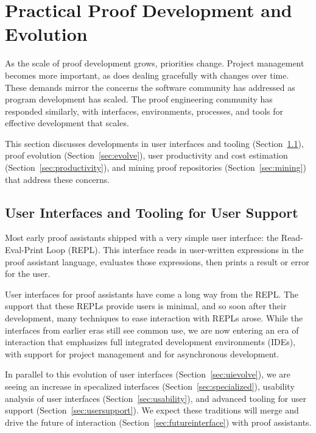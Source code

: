 \chapter{Practical Proof Development and Evolution}
\label{ch:development}

As the scale of proof development grows, priorities change. Project management becomes more important, as does dealing
gracefully with changes over time. These demands mirror the concerns the software community has addressed as 
program development has scaled. The proof engineering community has responded similarly, with interfaces,
environments, processes, and tools for effective development that scales.

This section discusses developments in user interfaces and tooling (Section~\ref{sec:user}),
proof evolution (Section~\ref{sec:evolve}), user productivity and cost estimation (Section~\ref{sec:productivity}),
and mining proof repositories (Section~\ref{sec:mining}) that address these concerns.


\section{User Interfaces and Tooling for User Support}
\label{sec:user}

Most early proof assistants shipped with a very simple user
interface: the Read-Eval-Print Loop (REPL). This interface reads in user-written
expressions in the proof assistant language, evaluates those expressions,
then prints a result or error for the user.

User interfaces for proof assistants have come a long way from the 
REPL. The support that these REPLs provide users is minimal, and so soon after
their development, many techniques to ease interaction with REPLs arose.
While the interfaces from earlier eras still see common use, we are now entering an era
of interaction that emphasizes full integrated development environments (IDEs),
with support for project management and for asynchronous development.

In parallel to this evolution of user interfaces (Section~\ref{sec:uievolve}), we are seeing an increase
in specalized interfaces (Section~\ref{sec:specialized}),
usability analysis of user interfaces (Section~\ref{sec:usability}),
and advanced tooling for user support (Section~\ref{sec:usersupport}).
We expect these traditions will merge and drive the future of interaction (Section~\ref{sec:futureinterface}) 
with proof assistants.

